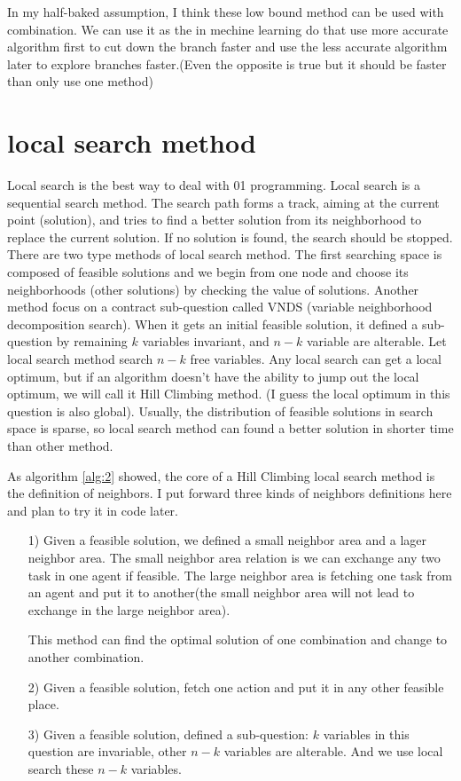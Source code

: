 \documentclass[10pt, Oct]{IEEEtran}
\begin{document}
In my half-baked assumption, I think these low bound method can be used with combination. We can use it as the in mechine learning do that use more accurate algorithm first to cut down the branch faster and use the less accurate algorithm later to explore branches faster.(Even the opposite is true but it should be faster than only use one method)

\section{local search method}
Local search is the best way to deal with 01 programming.
Local search is a sequential search method. The search path forms a track, aiming at the current point (solution), and tries to find a better solution from its neighborhood to replace the current solution. If no solution is found, the search should be stopped.
There are two type methods of local search method. The first searching space is composed of feasible solutions and we begin from one node and choose its neighborhoods (other solutions) by checking the value of solutions. Another method focus on a contract sub-question called VNDS (variable neighborhood decomposition search). When it gets an initial feasible solution,  it defined a sub-question by remaining $k$ variables invariant, and $n-k$ variable are alterable. Let local search method search $n-k$ free variables.
Any local search can get a local optimum, but if an algorithm doesn't have the ability to jump out the local optimum, we will call it Hill Climbing method. (I guess the local optimum in this question is also global).
Usually, the distribution of feasible solutions in search space is sparse, so local search method can found a better solution in shorter time than other method.

As algorithm \ref{alg:2} showed, the core of a Hill Climbing local search method is the definition of neighbors. I put forward three kinds of neighbors definitions here and plan to try it in code later.
\begin{itemize}
\item [1)]
    Given a feasible solution, we defined a small neighbor area and a lager neighbor area. The small neighbor area relation is we can exchange any two task in one agent if feasible. The large neighbor area is fetching one task from an agent and put it to another(the small neighbor area will not lead to exchange in the large neighbor area).
    
    This method can find the optimal solution of one combination and change to another combination.
\item [2)]
    Given a feasible solution, fetch one action and put it in any other feasible place.
\item [3)]
    Given a feasible solution, defined a sub-question: $k$ variables in this question are invariable, other $n-k$ variables are alterable. And we use local search these $n-k$ variables.
\end{itemize}
\end{document}

